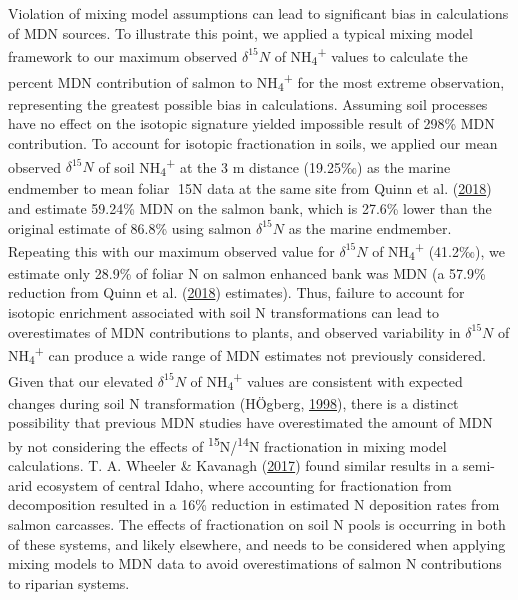 \documentclass [11pt, proquest] {uwthesis}[2015/03/03]
\begin{document}
Violation of mixing model assumptions can lead to significant bias in
calculations of MDN sources. To illustrate this point, we applied a
typical mixing model framework to our maximum observed \(\delta^{15}N\)
of NH\textsubscript{4}\textsuperscript{+} values to calculate the
percent MDN contribution of salmon to
NH\textsubscript{4}\textsuperscript{+} for the most extreme observation,
representing the greatest possible bias in calculations. Assuming soil
processes have no effect on the isotopic signature yielded impossible
result of 298\% MDN contribution. To account for isotopic fractionation
in soils, we applied our mean observed \(\delta^{15}N\) of soil
NH\textsubscript{4}\textsuperscript{+} at the 3 m distance (19.25‰) as
the marine endmember to mean foliar 15N data at the same site from
Quinn et al. (\protect\hyperlink{ref-Quinn2018}{2018}) and estimate
59.24\% MDN on the salmon bank, which is 27.6\% lower than the original
estimate of 86.8\% using salmon \(\delta^{15}N\) as the marine
endmember. Repeating this with our maximum observed value for
\(\delta^{15}N\) of NH\textsubscript{4}\textsuperscript{+} (41.2‰), we
estimate only 28.9\% of foliar N on salmon enhanced bank was MDN (a
57.9\% reduction from Quinn et al.
(\protect\hyperlink{ref-Quinn2018}{2018}) estimates). Thus, failure to
account for isotopic enrichment associated with soil N transformations
can lead to overestimates of MDN contributions to plants, and observed
variability in \(\delta^{15}N\) of
NH\textsubscript{4}\textsuperscript{+} can produce a wide range of MDN
estimates not previously considered. Given that our elevated
\(\delta^{15}N\) of NH\textsubscript{4}\textsuperscript{+} values are
consistent with expected changes during soil N transformation (HÖgberg,
\protect\hyperlink{ref-Hogberg1998}{1998}), there is a distinct
possibility that previous MDN studies have overestimated the amount of
MDN by not considering the effects of
\textsuperscript{15}N/\textsuperscript{14}N fractionation in mixing
model calculations. T. A. Wheeler \& Kavanagh
(\protect\hyperlink{ref-Wheeler2017}{2017}) found similar results in a
semi-arid ecosystem of central Idaho, where accounting for fractionation
from decomposition resulted in a 16\% reduction in estimated N
deposition rates from salmon carcasses. The effects of fractionation on
soil N pools is occurring in both of these systems, and likely
elsewhere, and needs to be considered when applying mixing models to MDN
data to avoid overestimations of salmon N contributions to riparian
systems.
\end{document}
